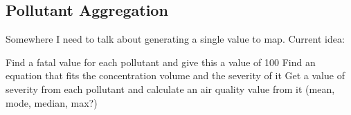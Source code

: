 \subsection{Pollutant Aggregation}\label{aggregation}

Somewhere I need to talk about generating a single value to map. Current idea:

Find a fatal value for each pollutant and give this a value of 100
Find an equation that fits the concentration volume and the severity of it
Get a value of severity from each pollutant and calculate an air quality value from it (mean, mode, median, max?)


